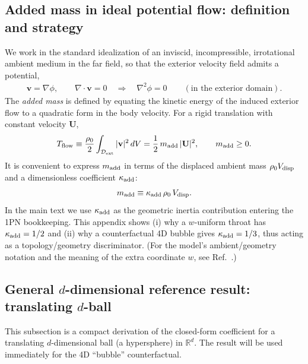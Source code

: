 \documentclass[11pt]{article}
\begin{document}
\subsection{Added mass in ideal potential flow: definition and strategy}
We work in the standard idealization of an inviscid, incompressible, irrotational
ambient medium in the far field, so that the exterior velocity field admits a
potential,
\begin{align}
\mathbf v = \nabla \phi,
\qquad
\nabla \cdot \mathbf v = 0
\quad\Longrightarrow\quad
\nabla^2 \phi = 0
\qquad
(\text{in the exterior domain}).
\end{align}
The \emph{added mass} is defined by equating the kinetic energy of the induced
exterior flow to a quadratic form in the body velocity.  For a rigid translation
with constant velocity $\mathbf U$,
\begin{align}
T_{\rm flow}
\equiv
\frac{\rho_0}{2}\int_{\mathcal D_{\rm ext}} |\mathbf v|^2\,dV
=
\frac{1}{2}\,m_{\rm add}\,|\mathbf U|^2,
\qquad
m_{\rm add}\ge 0.
\end{align}
It is convenient to express $m_{\rm add}$ in terms of the displaced ambient mass
$\rho_0 V_{\rm disp}$ and a dimensionless coefficient $\kappa_{\rm add}$:
\begin{align}
m_{\rm add} \equiv \kappa_{\rm add}\,\rho_0\,V_{\rm disp}.
\end{align}
In the main text we use $\kappa_{\rm add}$ as the geometric inertia contribution
entering the 1PN bookkeeping.  This appendix shows (i) why a $w$-uniform throat
has $\kappa_{\rm add}=1/2$ and (ii) why a counterfactual 4D bubble gives
$\kappa_{\rm add}=1/3$, thus acting as a topology/geometry discriminator.
(For the model's ambient/geometry notation and the meaning of the extra coordinate $w$,
see Ref.~\cite{norris2026_4d_model}.)

\subsection{General $d$-dimensional reference result: translating $d$-ball}
\label{app:added_mass:d_ball}
This subsection is a compact derivation of the closed-form coefficient for a
translating $d$-dimensional ball (a hypersphere) in $\mathbb R^d$.
The result will be used immediately for the 4D ``bubble'' counterfactual.
\end{document}
